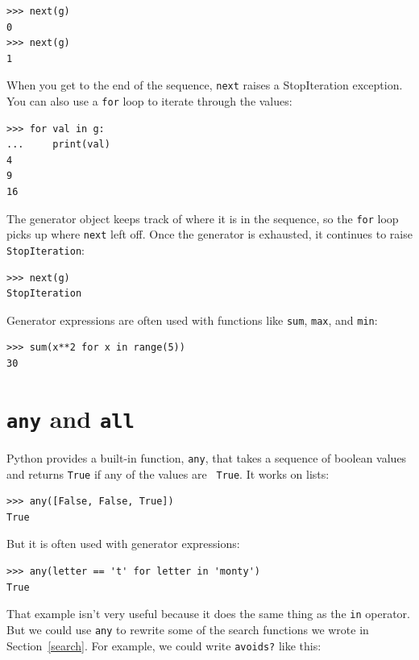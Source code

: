 \documentclass[10pt]{book}
\begin{document}
\begin{verbatim}
>>> next(g)
0
>>> next(g)
1
\end{verbatim}
%
When you get to the end of the sequence, {\tt next} raises a 
StopIteration exception.  You can also use a {\tt for} loop to iterate
through the values:

\begin{verbatim}
>>> for val in g:
...     print(val)
4
9
16
\end{verbatim}
%
The generator object keeps track of where it is in the sequence,
so the {\tt for} loop picks up where {\tt next} left off.  Once the
generator is exhausted, it continues to raise {\tt StopIteration}:

\begin{verbatim}
>>> next(g)
StopIteration
\end{verbatim}

Generator expressions are often used with functions like {\tt sum},
{\tt max}, and {\tt min}:

\begin{verbatim}
>>> sum(x**2 for x in range(5))
30
\end{verbatim}


\section{{\tt any} and {\tt all}}

Python provides a built-in function, {\tt any}, that takes a sequence
of boolean values and returns {\tt True} if any of the values are {\tt
  True}.  It works on lists:

\begin{verbatim}
>>> any([False, False, True])
True
\end{verbatim}
%
But it is often used with generator expressions:

\begin{verbatim}
>>> any(letter == 't' for letter in 'monty')
True
\end{verbatim}
%
That example isn't very useful because it does the same thing
as the {\tt in} operator.  But we could use {\tt any} to rewrite
some of the search functions we wrote in Section~\ref{search}.  For
example, we could write {\tt avoids?} like this:
\end{document}
